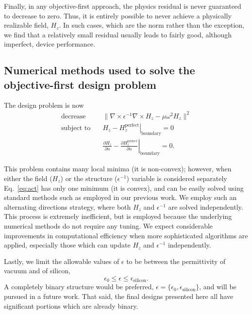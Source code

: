 \documentclass[letterpaper,10pt]{article}
\begin{document}
Finally, in any objective-first approach,
    the physics residual is never guaranteed to decrease to zero.
Thus, it is entirely possible to never achieve 
    a physically realizable field, $H_z$.
In such cases, which are the norm rather than the exception,
    we find that a relatively small residual usually leads to
    fairly good, although imperfect, device performance.
    
\subsection{Numerical methods used to solve the objective-first design problem}
The design problem is now
    \begin{subequations}\label{eq:act}
    \begin{align} 
    \text{decrease} & \quad  
        \| \nabla \times \epsilon^{-1} \nabla \times H_z - \mu \omega^2 H_z \|^2
        \label{eq:act:obj} \\ 
    \text{subject to} & \quad 
        \left. H_z - H_z^\text{perfect} \right| _\text{boundary} = 0 
        \label{eq:act:con1} \\
        & \quad 
        \left. \frac{\partial H_z}{\partial n} - 
        \frac{\partial H_z^\text{perfect}}{\partial n} \right|_\text{boundary}
            = 0. \label{eq:act:con2}
    \end{align}
    \end{subequations}

This problem contains many local minima (it is non-convex\cite{});
    however, when either the field ($H_z$) or the structure ($\epsilon^{-1}$)
    variable is considered separately Eq.~\ref{eq:act} has only one minimum
    (it is convex), and can be easily solved using standard methods
    such as employed in our previous work\cite{}.
We employ such an alternating directions strategy,
    where both $H_z$ and $\epsilon^{-1}$ are solved independently.
This process is extremely inefficient,
    but is employed because the underlying numerical methods
    do not require any tuning.
We expect considerable improvements in computational efficiency
    when more sophisticated algorithms are applied,
    especially those which can update $H_z$ and $\epsilon^{-1}$ independently.
    
Lastly, we limit the allowable values of $\epsilon$ to be between
    the permittivity of vacuum and of silicon,
    \begin{equation}
    \epsilon_0 \le \epsilon \le \epsilon_\text{silicon}.
    \end{equation}
A completely binary structure would be preferred,
    $\epsilon = \{\epsilon_0, \epsilon_\text{silicon}\}$,
    and will be pursued in a future work.
That said, the final designs presented here 
    all have significant portions which are already binary.
\end{document}
